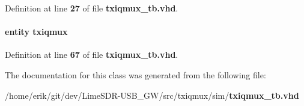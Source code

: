 Definition at line {\bf 27} of file {\bf txiqmux\+\_\+tb.\+vhd}.

\paragraph[{txiqmux\+\_\+inst0}]{ {\bfseries \textcolor{keywordflow}{entity}\textcolor{vhdlchar}{ }\textcolor{vhdlchar}{txiqmux}\textcolor{vhdlchar}{ }} \hspace{0.3cm}{\ttfamily [Instantiation]}}\label{classtxiqmux__tb_1_1tb__behave_a323c974c40576fe8ed623e4a1ac73f45}


Definition at line {\bf 67} of file {\bf txiqmux\+\_\+tb.\+vhd}.



The documentation for this class was generated from the following file\+:\begin{DoxyCompactItemize}
\item 
/home/erik/git/dev/\+Lime\+S\+D\+R-\/\+U\+S\+B\+\_\+\+G\+W/src/txiqmux/sim/{\bf txiqmux\+\_\+tb.\+vhd}\end{DoxyCompactItemize}

